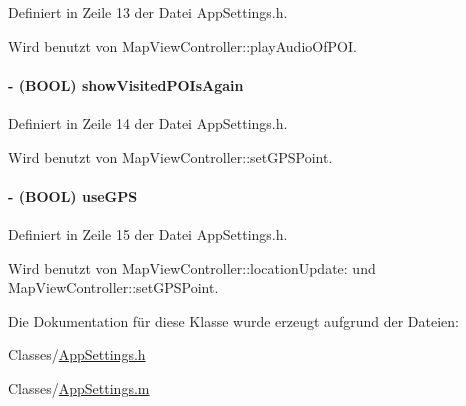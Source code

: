 Definiert in Zeile 13 der Datei AppSettings.h.

Wird benutzt von MapViewController::playAudioOfPOI.\hypertarget{interface_app_settings_af7ae7b5c83724aff405927b79144958c}{
\paragraph[{showVisitedPOIsAgain}]{\setlength{\rightskip}{0pt plus 5cm}-\/ (BOOL) showVisitedPOIsAgain}\hfill}
\label{interface_app_settings_af7ae7b5c83724aff405927b79144958c}


Definiert in Zeile 14 der Datei AppSettings.h.

Wird benutzt von MapViewController::setGPSPoint.\hypertarget{interface_app_settings_ab55e564f5442214c576ee05d7c43b171}{
\paragraph[{useGPS}]{\setlength{\rightskip}{0pt plus 5cm}-\/ (BOOL) useGPS}\hfill}
\label{interface_app_settings_ab55e564f5442214c576ee05d7c43b171}


Definiert in Zeile 15 der Datei AppSettings.h.

Wird benutzt von MapViewController::locationUpdate: und MapViewController::setGPSPoint.

Die Dokumentation für diese Klasse wurde erzeugt aufgrund der Dateien:\begin{DoxyCompactItemize}
\item 
Classes/\hyperlink{_app_settings_8h}{AppSettings.h}\item 
Classes/\hyperlink{_app_settings_8m}{AppSettings.m}\end{DoxyCompactItemize}
